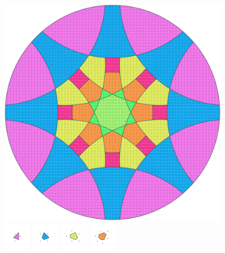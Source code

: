 \documentclass[text.tex]{subfiles}
\begin{document}
\clearpage
\pagestyle{fancy}
\fancyhf{}
\begin{figure}[h!]
\centering
\includegraphics[width=1\textwidth]{img/results/circle8/circle8_160022_(5267_-2181alpha_1).pdf}
\includegraphics[width=0.12\textwidth]{img/results/circle8/circle8_160022_(5267_-2181alpha_1)_001.pdf}
\includegraphics[width=0.12\textwidth]{img/results/circle8/circle8_160022_(5267_-2181alpha_1)_002.pdf}
\includegraphics[width=0.12\textwidth]{img/results/circle8/circle8_160022_(5267_-2181alpha_1)_003.pdf}
\includegraphics[width=0.12\textwidth]{img/results/circle8/circle8_160022_(5267_-2181alpha_1)_004.pdf}

\end{figure}
\end{document}
